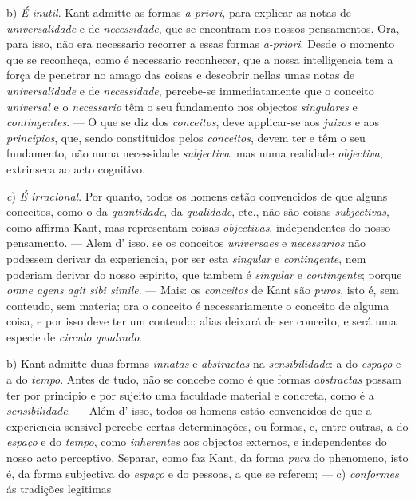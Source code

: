 b) \emph{É inutil}. Kant admitte as formas \emph{a-priori}, para explicar as notas de \emph{universalidade} e de \emph{necessidade}, que se encontram nos nossos pensamentos. Ora, para isso, não era necessario recorrer a essas formas \emph{a-priori}. Desde o momento que se reconheça, como é necessario reconhecer, que a nossa intelligencia tem a força de penetrar no amago das coisas e descobrir nellas umas notas de \emph{universalidade} e de \emph{necessidade}, percebe-se immediatamente que o conceito \emph{universal} e o \emph{necessario} têm o seu fundamento nos objectos \emph{singulares} e \emph{contingentes}. --- O que se diz dos \emph{conceitos}, deve applicar-se aos \emph{juizos} e aos \emph{principios}, que, sendo constituidos pelos \emph{conceitos}, devem ter e têm o seu fundamento, não numa necessidade \emph{subjectiva}, mas numa realidade \emph{objectiva}, extrinseca ao acto cognitivo.

\emph{c}) \emph{É irracional}. Por quanto, todos os homens estão convencidos de que alguns conceitos, como o da \emph{quantidade}, da \emph{qualidade}, etc., não são coisas \emph{subjectivas}, como affirma Kant, mas representam coisas \emph{objectivas}, independentes do nosso pensamento. --- Alem d' isso, se os conceitos \emph{universaes} e \emph{necessarios} não podessem derivar da experiencia, por ser esta \emph{singular} e \emph{contingente}, nem poderiam derivar do nosso espirito, que tambem é \emph{singular} e \emph{contingente}; porque \emph{omne agens agit sibi simile}. --- Mais: os \emph{conceitos} de Kant são \emph{puros}, isto é, sem conteudo, sem materia; ora o conceito é necessariamente o conceito de alguma coisa, e por isso deve ter um conteudo: alias deixará de ser conceito, e será uma especie de \emph{circulo quadrado}.

b) Kant admitte duas formas \emph{innatas} e \emph{abstractas} na \emph{sensibilidade}: a do \emph{espaço} e a do \emph{tempo}. Antes de tudo, não se concebe como é que formas \emph{abstractas} possam ter por principio e por sujeito uma faculdade material e concreta, como é a \emph{sensibilidade}. --- Além d' isso, todos os homens estão convencidos de que a experiencia sensivel percebe certas determinações, ou formas, e, entre outras, a do \emph{espaço} e do \emph{tempo}, como \emph{inherentes} aos objectos externos, e independentes do nosso acto perceptivo. Separar, como faz Kant, da forma \emph{pura} do phenomeno, isto é, da forma subjectiva do \emph{espaço} e do   pessoas, a que se referem; --- c) \emph{conformes} ás tradições legitimas

